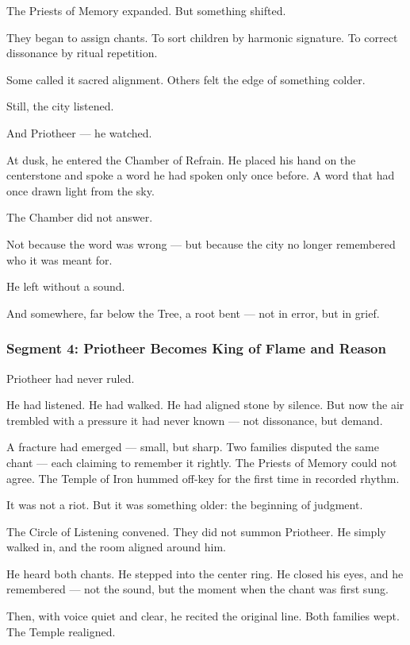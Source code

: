 \documentclass[9pt]{article}
\begin{document}
The Priests of Memory expanded.  
But something shifted.

They began to assign chants.  
To sort children by harmonic signature.  
To correct dissonance by ritual repetition.

Some called it sacred alignment.  
Others felt the edge of something colder.

Still, the city listened.

And Priotheer —  
he watched.

At dusk, he entered the Chamber of Refrain.  
He placed his hand on the centerstone and spoke a word he had spoken only once before.  
A word that had once drawn light from the sky.

The Chamber did not answer.

Not because the word was wrong —  
but because the city no longer remembered who it was meant for.

He left without a sound.

And somewhere, far below the Tree,  
a root bent — not in error,  
but in grief.

\newpage

\subsubsection*{Segment 4: Priotheer Becomes King of Flame and Reason}

Priotheer had never ruled.

He had listened. He had walked. He had aligned stone by silence.  
But now the air trembled with a pressure it had never known — not dissonance, but demand.

A fracture had emerged — small, but sharp.  
Two families disputed the same chant — each claiming to remember it rightly.  
The Priests of Memory could not agree.  
The Temple of Iron hummed off-key for the first time in recorded rhythm.

It was not a riot.  
But it was something older: the beginning of judgment.

The Circle of Listening convened.  
They did not summon Priotheer.  
He simply walked in, and the room aligned around him.

He heard both chants.  
He stepped into the center ring.  
He closed his eyes, and he remembered — not the sound, but the moment when the chant was first sung.

Then, with voice quiet and clear, he recited the original line.  
Both families wept.  
The Temple realigned.
\end{document}
